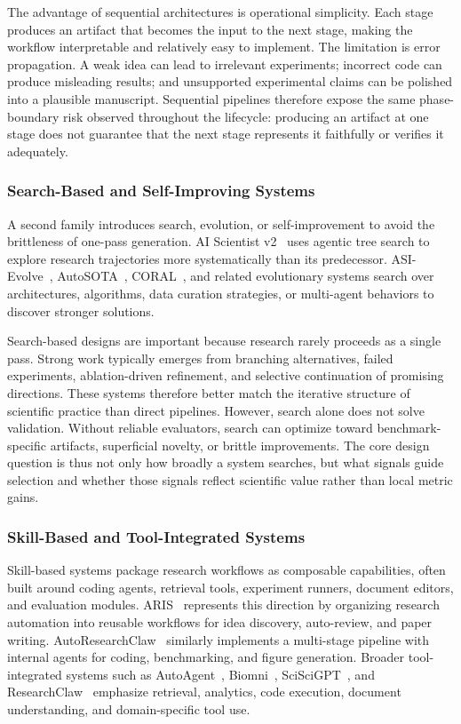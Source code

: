 \documentclass{llmxive}
\begin{document}
The advantage of sequential architectures is operational simplicity. Each stage produces an artifact that becomes the input to the next stage, making the workflow interpretable and relatively easy to implement. The limitation is error propagation. A weak idea can lead to irrelevant experiments; incorrect code can produce misleading results; and unsupported experimental claims can be polished into a plausible manuscript. Sequential pipelines therefore expose the same phase-boundary risk observed throughout the lifecycle: producing an artifact at one stage does not guarantee that the next stage represents it faithfully or verifies it adequately.

\subsubsection{Search-Based and Self-Improving Systems}

A second family introduces search, evolution, or self-improvement to avoid the brittleness of one-pass generation. AI Scientist v2~\cite{yamada2025aiscientistv2} uses agentic tree search to explore research trajectories more systematically than its predecessor. ASI-Evolve~\cite{asievolve2026}, AutoSOTA~\cite{autosota2026}, CORAL~\cite{coral2026}, and related evolutionary systems search over architectures, algorithms, data curation strategies, or multi-agent behaviors to discover stronger solutions.

Search-based designs are important because research rarely proceeds as a single pass. Strong work typically emerges from branching alternatives, failed experiments, ablation-driven refinement, and selective continuation of promising directions. These systems therefore better match the iterative structure of scientific practice than direct pipelines. However, search alone does not solve validation. Without reliable evaluators, search can optimize toward benchmark-specific artifacts, superficial novelty, or brittle improvements. The core design question is thus not only how broadly a system searches, but what signals guide selection and whether those signals reflect scientific value rather than local metric gains.

\subsubsection{Skill-Based and Tool-Integrated Systems}

Skill-based systems package research workflows as composable capabilities, often built around coding agents, retrieval tools, experiment runners, document editors, and evaluation modules. ARIS~\cite{aris2025} represents this direction by organizing research automation into reusable workflows for idea discovery, auto-review, and paper writing. AutoResearchClaw~\cite{autoresearchclaw2026} similarly implements a multi-stage pipeline with internal agents for coding, benchmarking, and figure generation. Broader tool-integrated systems such as AutoAgent~\cite{tang2025autodeepresearch}, Biomni~\cite{biomni2025}, SciSciGPT~\cite{sciscigpt2025}, and ResearchClaw~\cite{researchclaw2025} emphasize retrieval, analytics, code execution, document understanding, and domain-specific tool use.
\end{document}
